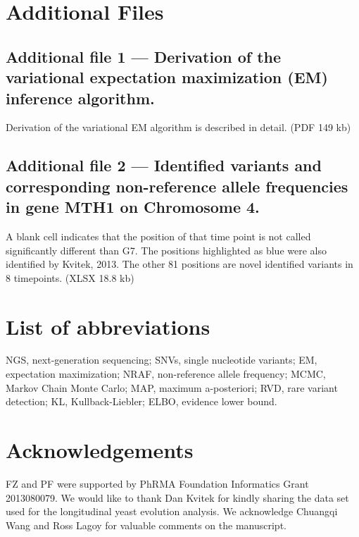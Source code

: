 \documentclass{bmcart}
\begin{document}
\begin{backmatter}
\section*{Additional Files}
  \subsection*{Additional file 1 --- Derivation of the variational expectation maximization (EM) inference algorithm.}\label{derivation}
  Derivation of the variational EM algorithm is described in detail. (PDF 149 kb)

  \subsection*{Additional file 2 --- Identified variants and corresponding non-reference allele frequencies in gene MTH1 on Chromosome 4.}\label{variants}
	A blank cell indicates that the position of that time point is not called significantly different than G7.
	The positions highlighted as blue were also identified by Kvitek, 2013.
	The other 81 positions are novel identified variants in 8 timepoints. (XLSX 18.8 kb)

\section*{List of abbreviations}
NGS, next-generation sequencing;
SNVs, single nucleotide variants;
EM, expectation maximization;
NRAF, non-reference allele frequency;
MCMC, Markov Chain Monte Carlo;
MAP, maximum a-posteriori;
RVD, rare variant detection;
KL, Kullback-Liebler;
ELBO, evidence lower bound.

\section*{Acknowledgements}
FZ and PF were supported by PhRMA Foundation Informatics Grant 2013080079.
We would like to thank Dan Kvitek for kindly sharing the data set used for the longitudinal yeast evolution analysis.
We acknowledge Chuangqi Wang and Ross Lagoy for valuable comments on the manuscript.



\end{backmatter}
\end{document}
